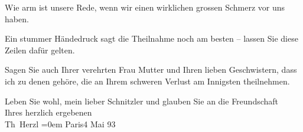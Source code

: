 \pstart
           Wie arm ist unsere Rede, wenn wir einen wirklichen grossen Schmerz vor uns haben. \pend
           
\pstart
           Ein stummer Händedruck sagt die Theilnahme noch am besten – lassen Sie diese Zeilen
               dafür gelten. \pend
           
\pstart
           Sagen Sie auch Ihrer verehrten Frau Mutter und Ihren lieben Geschwistern, dass ich zu denen
               gehöre, die an Ihrem schweren Verlust \introOben{}am\introOben{} Innigsten
               theilnehmen.\pend
           
\pstart
           Leben Sie wohl, mein lieber Schnitzler und glauben Sie an die Freundschaft
               {\\[\baselineskip]}Ihres herzlich ergebenen {\\[\baselineskip]}\spacefill\mbox{Th Herzl}\pend
           \leftskip=0em{}
\pstart
           Paris4 Mai 93\pend
           \endnumbering{}
\begin{anhang}
\end{anhang}
      